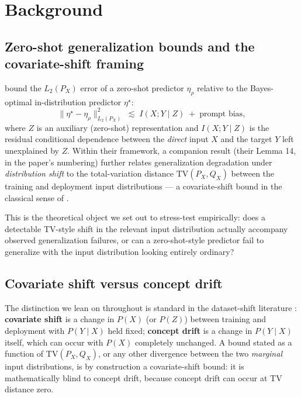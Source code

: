 \documentclass[11pt]{article}
\newcommand{\TV}{\mathrm{TV}}
\begin{document}
\section{Background}

\subsection{Zero-shot generalization bounds and the covariate-shift framing}

\citet{mehta2025generalization} bound the $L_2(P_X)$ error of a zero-shot predictor $\eta_\rho$ relative to the Bayes-optimal in-distribution predictor $\eta^\star$:
\[
\|\eta^\star - \eta_\rho\|^2_{L_2(P_X)} \;\lesssim\; I(X; Y \mid Z) \;+\; \text{prompt bias},
\]
where $Z$ is an auxiliary (zero-shot) representation and $I(X;Y\mid Z)$ is the residual conditional dependence between the \emph{direct} input $X$ and the target $Y$ left unexplained by $Z$. Within their framework, a companion result (their Lemma 14, in the paper's numbering) further relates generalization degradation under \emph{distribution shift} to the total-variation distance $\TV(P_X, Q_X)$ between the training and deployment input distributions --- a covariate-shift bound in the classical sense of \citet{quinonerocandela2009dataset}.

This is the theoretical object we set out to stress-test empirically: does a detectable TV-style shift in the relevant input distribution actually accompany observed generalization failures, or can a zero-shot-style predictor fail to generalize with the input distribution looking entirely ordinary?

\subsection{Covariate shift versus concept drift}

The distinction we lean on throughout is standard in the dataset-shift literature \citep{quinonerocandela2009dataset}: \textbf{covariate shift} is a change in $P(X)$ (or $P(Z)$) between training and deployment with $P(Y\mid X)$ held fixed; \textbf{concept drift} is a change in $P(Y\mid X)$ itself, which can occur with $P(X)$ completely unchanged. A bound stated as a function of $\TV(P_X, Q_X)$, or any other divergence between the two \emph{marginal} input distributions, is by construction a covariate-shift bound: it is mathematically blind to concept drift, because concept drift can occur at TV distance zero.
\end{document}

